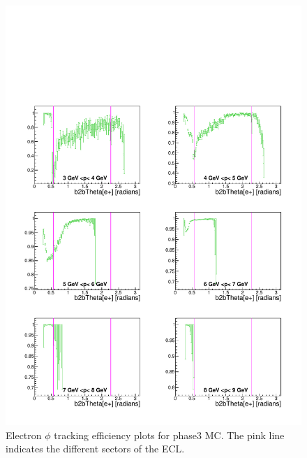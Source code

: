 \documentclass[a4paper,11pt,twosided,final,german,openbib,pdftex,listof=totoc,bibliography=totoc]{scrbook}
\begin{document}
\begin{appendix}
\begin{figure}[!htbp]
	\centering
	\includegraphics[width=\textwidth]{Plots/master3/xPMThetaem_MCP3}
	\caption[Momentum $\theta$ Electron Efficiency Phase3 MC]{Electron $\phi$ tracking efficiency plots for phase3 MC. The pink line indicates the different sectors of the ECL.}
	\label{plt:PMThetaem3_MC}
\end{figure}



\end{appendix}
\end{document}
